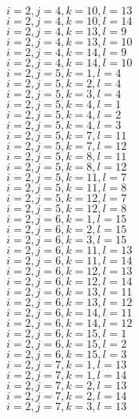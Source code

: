 \documentclass[14pt]{article}
\begin{document}
    $i=2,j=4,k=10,l=13 $ \\ 
    $i=2,j=4,k=10,l=14 $ \\ 
    $i=2,j=4,k=13,l=9 $ \\ 
    $i=2,j=4,k=13,l=10 $ \\ 
    $i=2,j=4,k=14,l=9 $ \\ 
    $i=2,j=4,k=14,l=10 $ \\ 
    $i=2,j=5,k=1,l=4 $ \\ 
    $i=2,j=5,k=2,l=4 $ \\ 
    $i=2,j=5,k=3,l=4 $ \\ 
    $i=2,j=5,k=4,l=1 $ \\ 
    $i=2,j=5,k=4,l=2 $ \\ 
    $i=2,j=5,k=4,l=3 $ \\ 
    $i=2,j=5,k=7,l=11 $ \\ 
    $i=2,j=5,k=7,l=12 $ \\ 
    $i=2,j=5,k=8,l=11 $ \\ 
    $i=2,j=5,k=8,l=12 $ \\ 
    $i=2,j=5,k=11,l=7 $ \\ 
    $i=2,j=5,k=11,l=8 $ \\ 
    $i=2,j=5,k=12,l=7 $ \\ 
    $i=2,j=5,k=12,l=8 $ \\ 
    $i=2,j=6,k=1,l=15 $ \\ 
    $i=2,j=6,k=2,l=15 $ \\ 
    $i=2,j=6,k=3,l=15 $ \\ 
    $i=2,j=6,k=11,l=13 $ \\ 
    $i=2,j=6,k=11,l=14 $ \\ 
    $i=2,j=6,k=12,l=13 $ \\ 
    $i=2,j=6,k=12,l=14 $ \\ 
    $i=2,j=6,k=13,l=11 $ \\ 
    $i=2,j=6,k=13,l=12 $ \\ 
    $i=2,j=6,k=14,l=11 $ \\ 
    $i=2,j=6,k=14,l=12 $ \\ 
    $i=2,j=6,k=15,l=1 $ \\ 
    $i=2,j=6,k=15,l=2 $ \\ 
    $i=2,j=6,k=15,l=3 $ \\ 
    $i=2,j=7,k=1,l=13 $ \\ 
    $i=2,j=7,k=1,l=14 $ \\ 
    $i=2,j=7,k=2,l=13 $ \\ 
    $i=2,j=7,k=2,l=14 $ \\ 
    $i=2,j=7,k=3,l=13 $ \\ 
\end{document}

